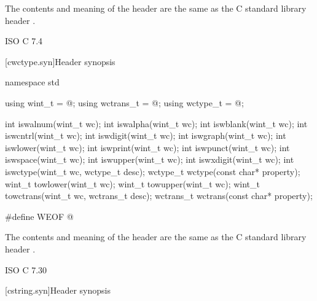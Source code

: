 \pnum
{}%
%
The contents and meaning of the header 
are the same as the C standard library header .

\xref ISO C 7.4

[cwctype.syn]{Header  synopsis}

%
%
%
%
%
%
%
%
%
%
%
%
%
%
%
%
%
%
%
%
%
%
%
%
\begin{codeblock}
namespace std {
  using wint_t = @\seebelow@;
  using wctrans_t = @\seebelow@;
  using wctype_t = @\seebelow@;

  int iswalnum(wint_t wc);
  int iswalpha(wint_t wc);
  int iswblank(wint_t wc);
  int iswcntrl(wint_t wc);
  int iswdigit(wint_t wc);
  int iswgraph(wint_t wc);
  int iswlower(wint_t wc);
  int iswprint(wint_t wc);
  int iswpunct(wint_t wc);
  int iswspace(wint_t wc);
  int iswupper(wint_t wc);
  int iswxdigit(wint_t wc);
  int iswctype(wint_t wc, wctype_t desc);
  wctype_t wctype(const char* property);
  wint_t towlower(wint_t wc);
  wint_t towupper(wint_t wc);
  wint_t towctrans(wint_t wc, wctrans_t desc);
  wctrans_t wctrans(const char* property);
}

#define WEOF @\seebelow@
\end{codeblock}

\pnum
{}%
%
The contents and meaning of the header 
are the same as the C standard library header .

\xref ISO C 7.30

[cstring.syn]{Header  synopsis}


